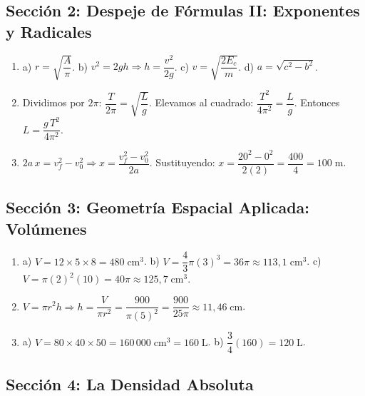 \documentclass[12pt, letterpaper]{article}
\begin{document}
  \newpage

  \subsection*{Sección 2: Despeje de Fórmulas II: Exponentes y Radicales}

  \begin{enumerate}[leftmargin=*, label=\textbf{\arabic*.}]
    \item a) $r = \sqrt{\dfrac{A}{\pi}}$. \quad
          b) $v^2 = 2gh \Rightarrow h = \dfrac{v^2}{2g}$. \quad
          c) $v = \sqrt{\dfrac{2E_c}{m}}$. \quad
          d) $a = \sqrt{c^2 - b^2}$.

    \item Dividimos por $2\pi$: $\dfrac{T}{2\pi} = \sqrt{\dfrac{L}{g}}$. Elevamos al cuadrado: $\dfrac{T^2}{4\pi^2} = \dfrac{L}{g}$.
          Entonces $L = \dfrac{g\,T^2}{4\pi^2}$.

    \item $2a\,x = v_f^2 - v_0^2 \Rightarrow x = \dfrac{v_f^2 - v_0^2}{2a}$.
          Sustituyendo: $x = \dfrac{20^2 - 0^2}{2(2)} = \dfrac{400}{4} = 100\;\text{m}$.
  \end{enumerate}

  \newpage

  \subsection*{Sección 3: Geometría Espacial Aplicada: Volúmenes}

  \begin{enumerate}[leftmargin=*, label=\textbf{\arabic*.}]
    \item a) $V = 12 \times 5 \times 8 = 480\;\text{cm}^3$.
          \quad b) $V = \dfrac{4}{3}\pi(3)^3 = 36\pi \approx 113{,}1\;\text{cm}^3$.
          \quad c) $V = \pi(2)^2(10) = 40\pi \approx 125{,}7\;\text{cm}^3$.

    \item $V = \pi r^2 h \Rightarrow h = \dfrac{V}{\pi r^2} = \dfrac{900}{\pi(5)^2} = \dfrac{900}{25\pi} \approx 11{,}46\;\text{cm}$.

    \item a) $V = 80 \times 40 \times 50 = 160\,000\;\text{cm}^3 = 160\;\text{L}$.
          \quad b) $\dfrac{3}{4}(160) = 120\;\text{L}$.
  \end{enumerate}

  \newpage

  \subsection*{Sección 4: La Densidad Absoluta}
\end{document}
